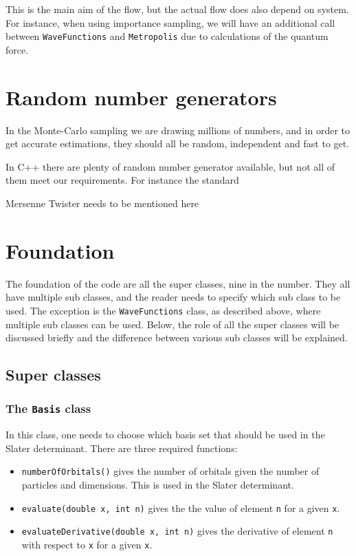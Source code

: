 

This is the main aim of the flow, but the actual flow does also depend on system. For instance, when using importance sampling, we will have an additional call between \texttt{WaveFunctions} and \texttt{Metropolis} due to calculations of the quantum force. 

\section{Random number generators} \label{sec:RNG}
In the Monte-Carlo sampling we are drawing millions of numbers, and in order to get accurate estimations, they should all be random, independent and fast to get. 

In C++ there are plenty of random number generator available, but not all of them meet our requirements. For instance the standard 

Mersenne Twister needs to be mentioned here

\section{Foundation} \label{subsec:foundation}
The foundation of the code are all the super classes, nine in the number. They all have multiple sub classes, and the reader needs to specify which sub class to be used. The exception is the \texttt{WaveFunctions} class, as described above, where multiple sub classes can be used. Below, the role of all the super classes will be discussed briefly and the difference between various sub classes will be explained. 

\subsection{Super classes}

\subsubsection{The \texttt{Basis} class}
In this class, one needs to choose which basis set that should be used in the Slater determinant. There are three required functions:
\begin{itemize}
	\item \texttt{numberOfOrbitals()} gives the number of orbitals given the number of particles and dimensions. This is used in the Slater determinant.
	
	\item \texttt{evaluate(double x, int n)} gives the the value of element \texttt{n} for a given \texttt{x}. 
	
	\item \texttt{evaluateDerivative(double x, int n)} gives the derivative of element \texttt{n} with respect to \texttt{x} for a given \texttt{x}.  
\end{itemize}

